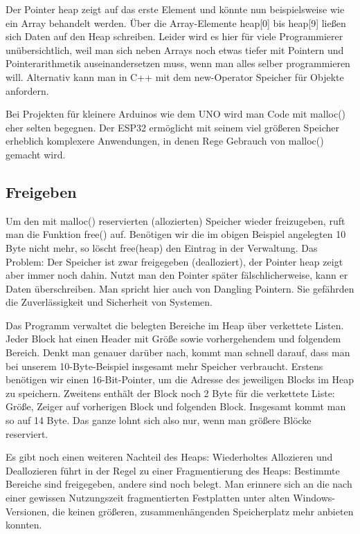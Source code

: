 Der Pointer heap zeigt auf das erste Element und könnte nun beispielsweise wie ein Array behandelt werden. Über die Array-Elemente heap[0] bis heap[9] ließen sich Daten auf den Heap schreiben. Leider wird es hier für viele Programmierer unübersichtlich, weil man sich neben Arrays noch etwas tiefer mit Pointern und Pointerarithmetik auseinandersetzen muss, wenn man alles selber programmieren will. Alternativ kann man in C++ mit dem new-Operator Speicher für Objekte anfordern.

Bei Projekten für kleinere Arduinos wie dem UNO wird man Code mit malloc() eher selten begegnen. Der ESP32 ermöglicht mit seinem viel größeren Speicher erheblich komplexere Anwendungen, in denen Rege Gebrauch von malloc() gemacht wird.

\subsection{Freigeben}

Um den mit malloc() reservierten (allozierten) Speicher wieder freizugeben, ruft man die Funktion free() auf. Benötigen wir die im obigen Beispiel angelegten 10 Byte nicht mehr, so löscht free(heap) den Eintrag in der Verwaltung. Das Problem: Der Speicher ist zwar freigegeben (dealloziert), der Pointer heap zeigt aber immer noch dahin. Nutzt man den Pointer später fälschlicherweise, kann er Daten überschreiben. Man spricht hier auch von Dangling Pointern. Sie gefährden die Zuverlässigkeit und Sicherheit von Systemen.

Das Programm verwaltet die belegten Bereiche im Heap über verkettete Listen. Jeder Block hat einen Header mit Größe sowie vorhergehendem und folgendem Bereich. Denkt man genauer darüber nach, kommt man schnell darauf, dass man bei unserem 10-Byte-Beispiel insgesamt mehr Speicher verbraucht. Erstens benötigen wir einen 16-Bit-Pointer, um die Adresse des jeweiligen Blocks im Heap zu speichern. Zweitens enthält der Block noch 2 Byte für die verkettete Liste: Größe, Zeiger auf vorherigen Block und folgenden Block. Insgesamt kommt man so auf 14 Byte. Das ganze lohnt sich also nur, wenn man größere Blöcke reserviert.

Es gibt noch einen weiteren Nachteil des Heaps: Wiederholtes Allozieren und Deallozieren führt in der Regel zu einer Fragmentierung des Heaps: Bestimmte Bereiche sind freigegeben, andere sind noch belegt. Man erinnere sich an die nach einer gewissen Nutzungszeit fragmentierten Festplatten unter alten Windows-Versionen, die keinen größeren, zusammenhängenden Speicherplatz mehr anbieten konnten.

